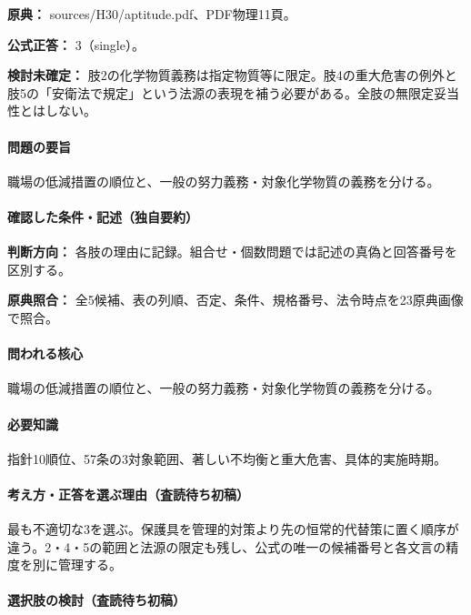 \noindent\textbf{原典：} sources/H30/aptitude.pdf、PDF物理11頁。

\textbf{公式正答：} 3（single）。

\par\textbf{検討未確定：} 肢2の化学物質義務は指定物質等に限定。肢4の重大危害の例外と肢5の「安衛法で規定」という法源の表現を補う必要がある。全肢の無限定妥当性とはしない。

\paragraph{問題の要旨} 職場の低減措置の順位と、一般の努力義務・対象化学物質の義務を分ける。

\paragraph{確認した条件・記述（独自要約）}\mbox{}\par

\noindent\textbf{判断方向：} 各肢の理由に記録。組合せ・個数問題では記述の真偽と回答番号を区別する。\par

\noindent\textbf{原典照合：} 全5候補、表の列順、否定、条件、規格番号、法令時点を23原典画像で照合。\par

\paragraph{問われる核心} 職場の低減措置の順位と、一般の努力義務・対象化学物質の義務を分ける。

\paragraph{必要知識} 指針10順位、57条の3対象範囲、著しい不均衡と重大危害、具体的実施時期。

\paragraph{考え方・正答を選ぶ理由（査読待ち初稿）} 最も不適切な3を選ぶ。保護具を管理的対策より先の恒常的代替策に置く順序が違う。2・4・5の範囲と法源の限定も残し、公式の唯一の候補番号と各文言の精度を別に管理する。

\paragraph{選択肢の検討（査読待ち初稿）}\mbox{}\par

